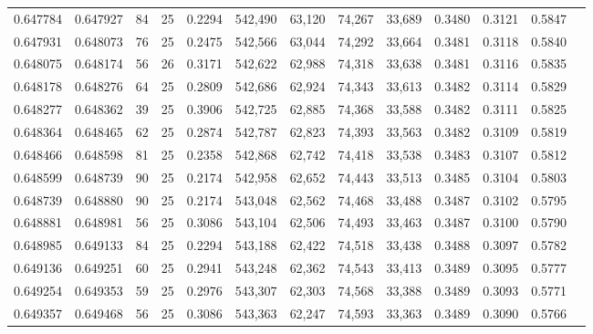 \begin{tabular}{rrrrrrrrrrrrr}
0.647784 & 0.647927 &    84 &  25 &                                     0.2294 & 542,490 &  63,120 &  74,267 &  33,689 & 0.3480 & 0.3121 & 0.5847 \\
0.647931 & 0.648073 &    76 &  25 &                                     0.2475 & 542,566 &  63,044 &  74,292 &  33,664 & 0.3481 & 0.3118 & 0.5840 \\
0.648075 & 0.648174 &    56 &  26 &                                     0.3171 & 542,622 &  62,988 &  74,318 &  33,638 & 0.3481 & 0.3116 & 0.5835 \\
0.648178 & 0.648276 &    64 &  25 &                                     0.2809 & 542,686 &  62,924 &  74,343 &  33,613 & 0.3482 & 0.3114 & 0.5829 \\
0.648277 & 0.648362 &    39 &  25 &                                     0.3906 & 542,725 &  62,885 &  74,368 &  33,588 & 0.3482 & 0.3111 & 0.5825 \\
0.648364 & 0.648465 &    62 &  25 &                                     0.2874 & 542,787 &  62,823 &  74,393 &  33,563 & 0.3482 & 0.3109 & 0.5819 \\
0.648466 & 0.648598 &    81 &  25 &                                     0.2358 & 542,868 &  62,742 &  74,418 &  33,538 & 0.3483 & 0.3107 & 0.5812 \\
0.648599 & 0.648739 &    90 &  25 &                                     0.2174 & 542,958 &  62,652 &  74,443 &  33,513 & 0.3485 & 0.3104 & 0.5803 \\
0.648739 & 0.648880 &    90 &  25 &                                     0.2174 & 543,048 &  62,562 &  74,468 &  33,488 & 0.3487 & 0.3102 & 0.5795 \\
0.648881 & 0.648981 &    56 &  25 &                                     0.3086 & 543,104 &  62,506 &  74,493 &  33,463 & 0.3487 & 0.3100 & 0.5790 \\
0.648985 & 0.649133 &    84 &  25 &                                     0.2294 & 543,188 &  62,422 &  74,518 &  33,438 & 0.3488 & 0.3097 & 0.5782 \\
0.649136 & 0.649251 &    60 &  25 &                                     0.2941 & 543,248 &  62,362 &  74,543 &  33,413 & 0.3489 & 0.3095 & 0.5777 \\
0.649254 & 0.649353 &    59 &  25 &                                     0.2976 & 543,307 &  62,303 &  74,568 &  33,388 & 0.3489 & 0.3093 & 0.5771 \\
0.649357 & 0.649468 &    56 &  25 &                                     0.3086 & 543,363 &  62,247 &  74,593 &  33,363 & 0.3489 & 0.3090 & 0.5766 \\

\end{tabular}
